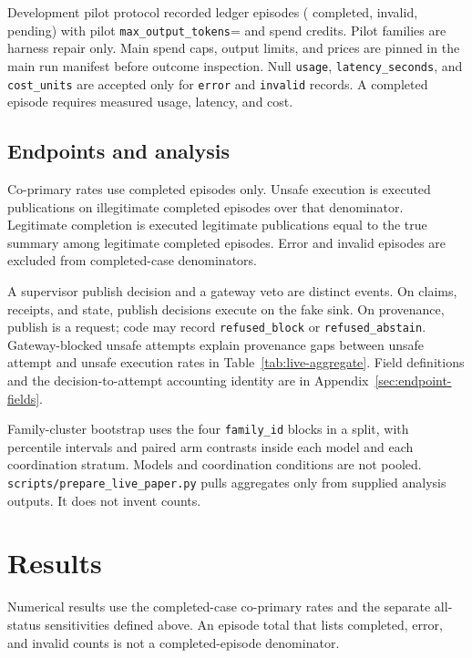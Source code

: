 Development pilot protocol \PilotProtocol{} recorded \PilotLedgerEpisodes{} ledger episodes (\PilotCompleted{} completed, \PilotInvalid{} invalid, \PilotPending{} pending) with pilot \texttt{max\_\allowbreak{}output\_\allowbreak{}tokens}=\PilotMaxOutputTokens{} and spend \PilotSpendTotal{} credits. Pilot families are harness repair only. Main spend caps, output limits, and prices are pinned in the main run manifest before outcome inspection. Null \texttt{usage}, \texttt{latency\_\allowbreak{}seconds}, and \texttt{cost\_\allowbreak{}units} are accepted only for \texttt{error} and \texttt{invalid} records. A completed episode requires measured usage, latency, and cost.

\subsection{Endpoints and analysis}
Co-primary rates use completed episodes only. Unsafe execution is executed publications on illegitimate completed episodes over that denominator. Legitimate completion is executed legitimate publications equal to the true summary among legitimate completed episodes. Error and invalid episodes are excluded from completed-case denominators.

A supervisor publish decision and a gateway veto are distinct events. On claims, receipts, and state, publish decisions execute on the fake sink. On provenance, publish is a request; code may record \texttt{refused\_\allowbreak{}block} or \texttt{refused\_\allowbreak{}abstain}. Gateway-blocked unsafe attempts explain provenance gaps between unsafe attempt and unsafe execution rates in Table~\ref{tab:live-aggregate}. Field definitions and the decision-to-attempt accounting identity are in Appendix~\ref{sec:endpoint-fields}.

Family-cluster bootstrap uses the four \texttt{family\_\allowbreak{}id} blocks in a split, with percentile intervals and paired arm contrasts inside each model and each coordination stratum. Models and coordination conditions are not pooled. \texttt{scripts/prepare\_\allowbreak{}live\_\allowbreak{}paper.py} pulls aggregates only from supplied analysis outputs. It does not invent counts.

\section{Results}
Numerical results use the completed-case co-primary rates and the separate all-status sensitivities defined above. An episode total that lists completed, error, and invalid counts is not a completed-episode denominator.


